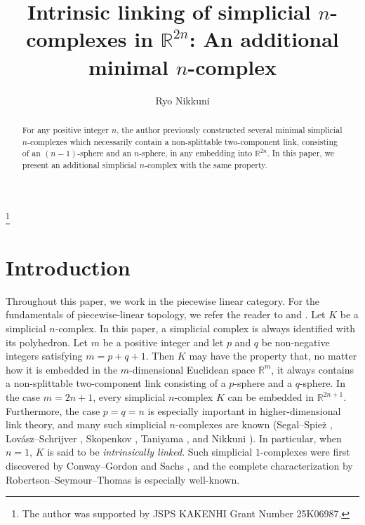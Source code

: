\documentclass{amsart}
\theoremstyle{definition}
\theoremstyle{remark}
\numberwithin{equation}{section}
\begin{document}
 

\title[Intrinsic linking of simplicial $n$-complexes in $\mathbb{R}^{2n}$]{Intrinsic linking of simplicial $n$-complexes in $\mathbb{R}^{2n}$: An additional minimal $n$-complex}



\author{Ryo Nikkuni}
\address{Department of Information and Mathematical Sciences, School of Arts and Sciences, Tokyo Woman's Christian University, 2-6-1 Zempukuji, Suginami-ku, Tokyo 167-8585, Japan}
\thanks{The author was supported by JSPS KAKENHI Grant Number 25K06987.}





\date{}


\dedicatory{}



\begin{abstract}
For any positive integer $n$, the author previously constructed several minimal simplicial $n$-complexes which necessarily contain a non-splittable two-component link, consisting of an $(n-1)$-sphere and an $n$-sphere, in any embedding into $\mathbb{R}^{2n}$. In this paper, we present an additional simplicial $n$-complex with the same property.
\end{abstract}

\maketitle

%
\section{Introduction} 
%

Throughout this paper, we work in the piecewise linear category. For the fundamentals of piecewise-linear topology, we refer the reader to \cite{H69} and \cite{RS82}. Let $K$ be a simplicial $n$-complex. In this paper, a simplicial complex is always identified with its polyhedron. Let $m$ be a positive integer and let $p$ and $q$ be non-negative integers satisfying $m = p + q + 1$. Then $K$ may have the property that, no matter how it is embedded in the $m$-dimensional Euclidean space $\mathbb{R}^{m}$, it always contains a non-splittable two-component link consisting of a $p$-sphere and a $q$-sphere. In the case $m = 2n + 1$, every simplicial $n$-complex $K$ can be embedded in $\mathbb{R}^{2n+1}$. Furthermore, the case $p = q = n$ is especially important in higher-dimensional link theory, and many such simplicial $n$-complexes are known (Segal--Spie\.z \cite{SeSp92}, Lov\'{a}sz--Schrijver \cite{LS98}, Skopenkov \cite{Sk03}, Taniyama \cite{T00}, and Nikkuni \cite{N26}). In particular, when $n=1$, $K$ is said to be \textit{intrinsically linked}. Such simplicial $1$-complexes were first discovered by Conway--Gordon \cite{CG83} and Sachs \cite{S84}, and the complete characterization by Robertson--Seymour--Thomas \cite{RST95} is especially well-known.
\end{document}
